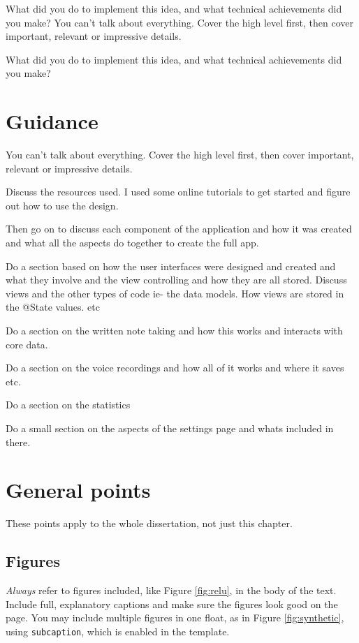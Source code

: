 \documentclass{l4proj}
\begin{document}
What did you do to implement this idea, and what technical achievements did you make?
You can't talk about everything. Cover the high level first, then cover important, relevant or impressive details.

What did you do to implement this idea, and what technical achievements did you make?
\section{Guidance}
You can't talk about everything. Cover the high level first, then cover important, relevant or impressive details.

\par 
Discuss the resources used. I used some online tutorials to get started and figure out how to use the design.
\par 
Then go on to discuss each component of the application and how it was created and what all the aspects do
together to create the full app. 
\par 
Do a section based on how the user interfaces were designed and created and what they involve and the view 
controlling and how they are all stored. Discuss views and the other types of code ie- the data models. How 
views are stored in the @State values. etc 
\par 
Do a section on the written note taking and how this works and interacts with core data.
\par 
Do a section on the voice recordings and how all of it works and where it saves etc.
\par 
Do a section on the statistics 
\par 
Do a small section on the aspects of the settings page and whats included in there.


\section{General points}

These points apply to the whole dissertation, not just this chapter.



\subsection{Figures}
\emph{Always} refer to figures included, like Figure \ref{fig:relu}, in the body of the text. Include full, explanatory captions and make sure the figures look good on the page.
You may include multiple figures in one float, as in Figure \ref{fig:synthetic}, using \texttt{subcaption}, which is enabled in the template.
\end{document}

